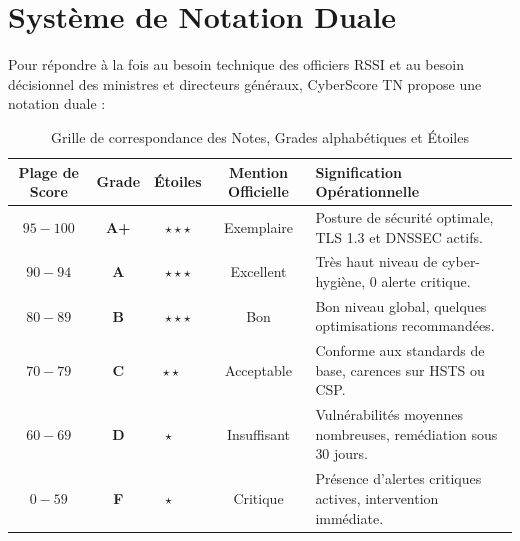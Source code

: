 \section{Système de Notation Duale}
Pour répondre à la fois au besoin technique des officiers RSSI et au besoin décisionnel des ministres et directeurs généraux, CyberScore TN propose une notation duale :

\begin{table}[!htbp]
\centering
\caption{Grille de correspondance des Notes, Grades alphabétiques et Étoiles}
\label{tab:grades}
\begin{singlespace}
\footnotesize
\renewcommand{\arraystretch}{1.1}
\begin{tabularx}{\textwidth}{c c c c X}
\toprule
\textbf{Plage de Score} & \textbf{Grade} & \textbf{Étoiles} & \textbf{Mention Officielle} & \textbf{Signification Opérationnelle} \\
\midrule
$95 - 100$ & \textbf{A+} & $\star\star\star$ & Exemplaire & Posture de sécurité optimale, TLS 1.3 et DNSSEC actifs. \\
$90 - 94$  & \textbf{A}  & $\star\star\star$ & Excellent & Très haut niveau de cyber-hygiène, 0 alerte critique. \\
$80 - 89$  & \textbf{B}  & $\star\star\star$ & Bon & Bon niveau global, quelques optimisations recommandées. \\
$70 - 79$  & \textbf{C}  & $\star\star\phantom{\star}$ & Acceptable & Conforme aux standards de base, carences sur HSTS ou CSP. \\
$60 - 69$  & \textbf{D}  & $\star\phantom{\star\star}$ & Insuffisant & Vulnérabilités moyennes nombreuses, remédiation sous 30 jours. \\
$0 - 59$   & \textbf{F}  & $\star\phantom{\star\star}$ & Critique & Présence d'alertes critiques actives, intervention immédiate. \\
\bottomrule
\end{tabularx}
\end{singlespace}
\end{table}

